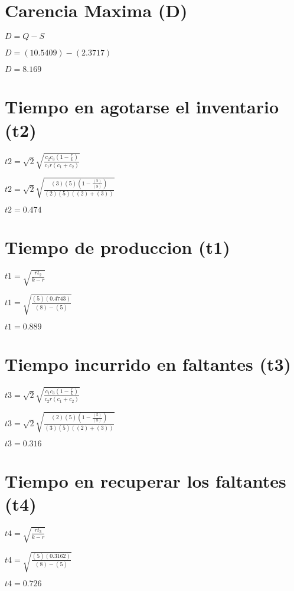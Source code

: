 \documentclass{article}
\newcommand*\rbreak{\par\noindent\linebreak}
\begin{document}
\section{\Huge \Huge Carencia Maxima (D)}
\begin{huge}
$D = Q - S$\rbreak
$D =  (10.5409)  -  (2.3717) $\rbreak
$D = 8.169$
\end{huge}
\section{\Huge \Huge Tiempo en agotarse el inventario (t2)}
\begin{huge}
$t2 = \sqrt{2} \sqrt{\frac{c_{2} c_{3} \left(1 - \frac{r}{k}\right)}{c_{1} r \left(c_{1} + c_{2}\right)}}$\rbreak
$t2 = \sqrt{2} \sqrt{\frac{(3) (5) \left(1 - \frac{ (5) }{ (8) }\right)}{(2)  (5)  \left((2) + (3)\right)}}$\rbreak
$t2 = 0.474$
\end{huge}
\section{\Huge \Huge Tiempo de produccion (t1)}
\begin{huge}
$t1 = \sqrt{\frac{r t_{2}}{k - r}}$\rbreak
$t1 = \sqrt{\frac{ (5)  (0.4743)}{ (8)  -  (5) }}$\rbreak
$t1 = 0.889$
\end{huge}
\section{\Huge \Huge Tiempo incurrido en faltantes (t3)}
\begin{huge}
$t3 = \sqrt{2} \sqrt{\frac{c_{1} c_{3} \left(1 - \frac{r}{k}\right)}{c_{2} r \left(c_{1} + c_{2}\right)}}$\rbreak
$t3 = \sqrt{2} \sqrt{\frac{(2) (5) \left(1 - \frac{ (5) }{ (8) }\right)}{(3)  (5)  \left((2) + (3)\right)}}$\rbreak
$t3 = 0.316$
\end{huge}
\section{\Huge \Huge Tiempo en recuperar los faltantes (t4)}
\begin{huge}
$t4 = \sqrt{\frac{r t_{3}}{k - r}}$\rbreak
$t4 = \sqrt{\frac{ (5)  (0.3162)}{ (8)  -  (5) }}$\rbreak
$t4 = 0.726$
\end{huge}
\end{document}
